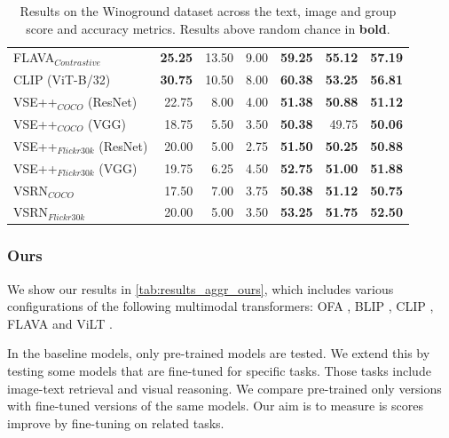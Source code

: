 \begin{table}[ht]
\begin{tabular}{l|rrr|rrr}
 FLAVA$_{Contrastive}$        & \textbf{25.25} & 13.50          & 9.00           & \textbf{59.25} & \textbf{55.12} & \textbf{57.19} \\
 CLIP (ViT-B/32)              & \textbf{30.75} & 10.50          & 8.00           & \textbf{60.38} & \textbf{53.25} & \textbf{56.81} \\
 VSE++$_{COCO}$ (ResNet)      & 22.75          & 8.00           & 4.00           & \textbf{51.38} & \textbf{50.88} & \textbf{51.12} \\
 VSE++$_{COCO}$ (VGG)         & 18.75          & 5.50           & 3.50           & \textbf{50.38} & 49.75          & \textbf{50.06} \\
 VSE++$_{Flickr30k}$ (ResNet) & 20.00          & 5.00           & 2.75           & \textbf{51.50} & \textbf{50.25} & \textbf{50.88} \\
 VSE++$_{Flickr30k}$ (VGG)    & 19.75          & 6.25           & 4.50           & \textbf{52.75} & \textbf{51.00} & \textbf{51.88} \\
 VSRN$_{COCO}$                & 17.50          & 7.00           & 3.75           & \textbf{50.38} & \textbf{51.12} & \textbf{50.75} \\
 VSRN$_{Flickr30k}$           & 20.00          & 5.00           & 3.50           & \textbf{53.25} & \textbf{51.75} & \textbf{52.50} \\
\bottomrule
\end{tabular}
\caption{Results on the Winoground dataset across the text, image and group score and accuracy metrics. Results above random chance in \textbf{bold}.}
\label{tab:results_aggr_baseline}
\end{table}

\subsubsection{Ours}

We show our results in \cref{tab:results_aggr_ours}, which includes various configurations of the following multimodal transformers: OFA \cite{wang2022unifying}, BLIP \cite{li2022blip}, CLIP \cite{radford2021clip}, FLAVA \cite{singh2022flava} and ViLT \cite{kim2021vilt}.

In the baseline models, only pre-trained models are tested. We extend this by testing some models that are fine-tuned for specific tasks. Those tasks include image-text retrieval and visual reasoning. We compare pre-trained only versions with fine-tuned versions of the same models. Our aim is to measure is scores improve by fine-tuning on related tasks.

